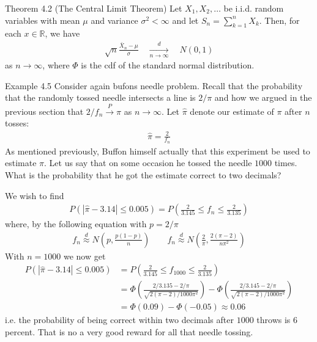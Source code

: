 \vspace{-4mm}
\begin{boks}{Theorem 4.2 (The Central Limit Theorem)}
  Let $X_1, X_2, \ldots$ be i.i.d. random variables with mean $\mu$ and variance $\sigma^2 < \infty$ and let $S_n = \sum_{k = 1}^{n} X_k$. Then, for each $x \in \mathbb{R}$, we have
  \begin{align*}
    \sqrt{n}\frac{\bar{X}_n - \mu}{\sigma} \quad \xrightarrow[n \rightarrow \infty]{d} \quad N(0,1)
  \end{align*}
  as $n \rightarrow \infty$, where $\Phi$ is the cdf of the standard normal distribution.
\end{boks}
\vspace{-5mm}
\begin{boks}{Example 4.5}
  Consider again bufons needle problem. Recall that the probability that the randomly tossed needle intersects a line is $2/\pi$ and how we argued in the previous section that $2/f_n \xrightarrow{P} \pi$ as $ n \rightarrow \infty$. Let $\hat{\pi}$ denote our estimate of $\pi$ after $n$ tosses:
  \begin{align*}
    \hat{\pi} = \frac{2}{f_n}
  \end{align*}
  As mentioned previously, Buffon himself actually that this experiment be used to estimate $\pi$. Let us say that on some occasion he tossed the needle $1000$ times. What is the probability that he got the estimate correct to two decimals?

  We wish to find
  \begin{align*}
    P(|\hat{\pi} - 3.14| \leq 0.005) = P\left( \frac{2}{3.145} \leq f_n \leq \frac{2}{3.135} \right)
  \end{align*}
  where, by the following equation with $p=2/\pi$
  \begin{align*}
    f_n \stackrel{d}{\approx} N\left( p, \frac{p(1 - p)}{n} \right) \qquad
    f_n \stackrel{d}{\approx} N\left( \frac{2}{\pi}, \frac{2(\pi - 2)}{n\pi^2} \right)
  \end{align*}
  With $n = 1000$ we now get
  \begin{align*}
    P(|\hat{\pi} - 3.14| \leq 0.005) &= P \left( \frac{2}{3.145} \leq f_{1000} \leq \frac{2}{3.135} \right)\\
    &=\Phi \left( \frac{2/3.135 - 2/\pi}{\sqrt{2(\pi - 2)/1000\pi^2}} \right) - \Phi\left( \frac{2/3.145 - 2/\pi}{\sqrt{2(\pi - 2)/1000\pi^2}} \right)\\
    &= \Phi(0.09) - \Phi(-0.05) \approx 0.06
  \end{align*}
  i.e. the probability of being correct within two decimals after $1000$ throws is 6 percent. That is no a very good reward for all that needle tossing.
\end{boks}
